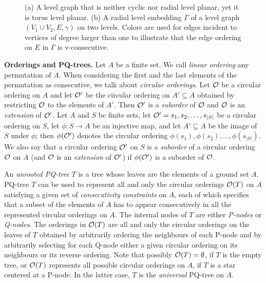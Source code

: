 \documentclass{llncs}
\begin{document}
\begin{figure}[tb!]
\centering
{}\hfil
{}
\caption{(a) A level graph that is neither cyclic nor radial level planar, yet it is torus level planar. (b) A radial level embedding $\Gamma$ of a level graph $(V_1 \cup V_2,E,\gamma)$ on two levels. Colors are used for edges incident to vertices of degree larger than one to illustrate that the edge ordering on $E$ in $\Gamma$ is v-consecutive.} 
\label{fig:something}
\end{figure}

\smallskip
\noindent
{\bf Orderings and PQ-trees.} Let $A$ be a finite set. 
We call {\em linear ordering} any permutation of $A$.
When considering the first and the last elements of the permutation as consecutive, we talk about {\em circular orderings}. 
Let $\cal O$ be a circular ordering on $A$ and let ${\cal O}'$ be the circular ordering on $A' \subseteq A$ obtained by restricting $\cal O$ to the elements of $A'$. Then ${\cal O}'$ is a {\em suborder} of $\cal O$ and $\cal O$ is an {\em extension} of $\cal O'$. 
Let $A$ and $S$ be finite sets, let ${\cal O}' = s_1,s_2,\dots,s_{|S|}$ be a circular ordering on $S$, let  $\phi: S \rightarrow A$ be an injective map, and let $A' \subseteq A$ be the image of $S$ under $\phi$;
then $\phi({\cal O}')$ denotes the circular ordering $\phi(s_1),\phi(s_2),\dots,\phi(s_{|S|})$.
We also say that a circular ordering ${\cal O}'$ on $S$ is a {\em suborder} of a circular ordering $\cal O$ on $A$ (and $\cal O$ is an {\em extension} of ${\cal O}'$) if $\phi({\cal O'})$ is a suborder of ${\cal O}$.

An \emph{unrooted PQ-tree} $T$ is a tree whose leaves are the elements of a ground set $A$. PQ-tree $T$ can be used to represent all and only the circular orderings ${\cal O}(T)$ on $A$ satisfying a given set of \emph{consecutivity constraints} on $A$, each of which specifies that a subset of the elements of $A$ has to appear consecutively in all the represented circular orderings on $A$. 
The internal nodes of $T$ are either {\em P-nodes} or {\em Q-nodes}. The orderings in ${\cal O}(T)$ are all and only the circular orderings on the leaves of $T$ obtained by arbitrarily ordering the neighbours of each P-node and by arbitrarily selecting for each Q-node either a given circular ordering on its neighbours or its reverse ordering.
Note that possibly ${\cal O}(T)=\emptyset$, if $T$ is the empty tree, or ${\cal O}(T)$ represents all possible circular orderings on $A$, if $T$ is a star centered at a P-node. In the latter case, $T$ is the {\em universal} PQ-tree on $A$.
\end{document}
